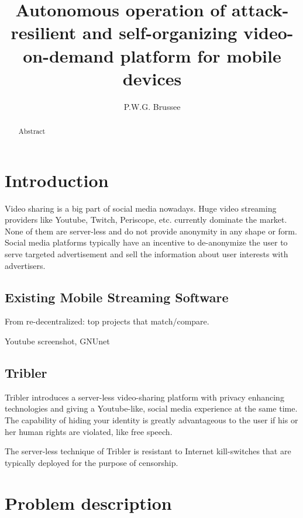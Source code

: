 \documentclass[]{report}
\title{Autonomous operation of attack-resilient and self-organizing video-on-demand  platform for mobile devices}
\author{P.W.G. Brussee}
\begin{document}
\maketitle

\begin{abstract}
	Abstract
\end{abstract}



\chapter{Introduction}

Video sharing is a big part of social media nowadays.
Huge video streaming providers like Youtube, Twitch, Periscope, etc. currently dominate the market.
None of them are server-less and do not  provide anonymity in any shape or form.
Social media platforms typically have an incentive to de-anonymize the user to serve targeted advertisement and sell the information about user interests with advertisers.


\section{Existing Mobile Streaming Software}
From re-decentralized: top projects that match/compare.

Youtube screenshot, GNUnet


\section{Tribler}
Tribler introduces a server-less video-sharing platform with privacy enhancing technologies and giving a Youtube-like, social media experience at the same time.
The capability of hiding your identity is greatly advantageous to the user if his or her human rights are violated, like free speech.

The server-less technique of Tribler is resistant to Internet kill-switches that are typically deployed for the purpose of censorship.




\chapter{Problem description}
\end{document}

